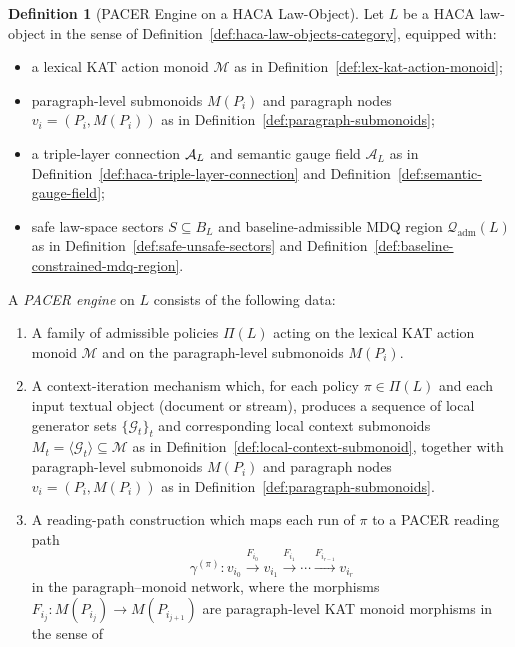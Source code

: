 \documentclass[11pt]{book}
\theoremstyle{plain}
\theoremstyle{definition}
\newtheorem{definition}[theorem]{Definition}
\theoremstyle{remark}
\begin{document}
\begin{definition}[PACER Engine on a HACA Law-Object]
\label{def:pacer-engine-haca}
Let $L$ be a HACA law-object in the sense of
Definition~\ref{def:haca-law-objects-category}, equipped with:
\begin{itemize}
  \item a lexical KAT action monoid $\mathcal{M}$ as in
        Definition~\ref{def:lex-kat-action-monoid};
  \item paragraph-level submonoids $M(P_i)$ and paragraph nodes
        $v_i=(P_i,M(P_i))$ as in
        Definition~\ref{def:paragraph-submonoids};
  \item a triple-layer connection
        $\mathcal{A}_L$ and semantic gauge field $\mathcal{A}_L$ as in
        Definition~\ref{def:haca-triple-layer-connection} and
        Definition~\ref{def:semantic-gauge-field};
  \item safe law-space sectors $S\subseteq B_L$ and baseline-admissible
        MDQ region $\mathcal{Q}_{\mathrm{adm}}(L)$ as in
        Definition~\ref{def:safe-unsafe-sectors} and
        Definition~\ref{def:baseline-constrained-mdq-region}.
\end{itemize}
A \emph{PACER engine} on $L$ consists of the following data:
\begin{enumerate}
  \item A family of admissible policies $\Pi(L)$ acting on the lexical
        KAT action monoid $\mathcal{M}$ and on the paragraph-level
        submonoids $M(P_i)$.
  \item A context-iteration mechanism which, for each policy
        $\pi\in\Pi(L)$ and each input textual object (document or
        stream), produces a sequence of local generator sets
        $\{\mathcal{G}_t\}_t$ and corresponding local context submonoids
        $M_t=\langle\mathcal{G}_t\rangle\subseteq\mathcal{M}$ as in
        Definition~\ref{def:local-context-submonoid}, together with
        paragraph-level submonoids $M(P_i)$ and paragraph nodes
        $v_i=(P_i,M(P_i))$ as in
        Definition~\ref{def:paragraph-submonoids}.
  \item A reading-path construction which maps each run of $\pi$ to a
        PACER reading path
        \[
          \gamma^{(\pi)}:
          v_{i_0}\xrightarrow{F_{i_0}}v_{i_1}\xrightarrow{F_{i_1}}\cdots
          \xrightarrow{F_{i_{r-1}}}v_{i_r}
        \]
        in the paragraph--monoid network, where the morphisms
        $F_{i_j}:M(P_{i_j})\to M(P_{i_{j+1}})$ are paragraph-level KAT
        monoid morphisms in the sense of

\end{enumerate}
\end{definition}
\end{document}
